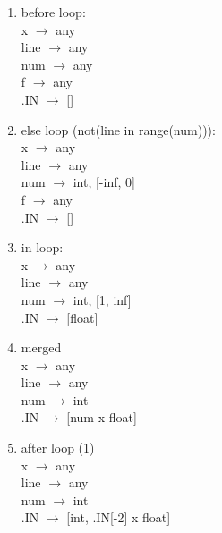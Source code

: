 \documentclass[11pt]{article}
\begin{document}
\begin{enumerate}
  \item before loop: \\
  x $\rightarrow$ any \\
  line $\rightarrow$ any \\
  num $\rightarrow$ any \\
  f $\rightarrow$ any \\
  .IN $\rightarrow$ []
  
  \item else loop (not(line in range(num))): \\
  x $\rightarrow$ any \\
  line $\rightarrow$ any \\
  num $\rightarrow$ int, [-inf, 0] \\
  f $\rightarrow$ any \\
  .IN $\rightarrow$ []
  
  \item in loop: \\
  x $\rightarrow$ any \\
  line $\rightarrow$ any \\
  num $\rightarrow$ int, [1, inf] \\
  .IN $\rightarrow$ [float]
  
  \item merged \\
  x $\rightarrow$ any \\
  line $\rightarrow$ any \\
  num $\rightarrow$ int \\
  .IN $\rightarrow$ [num x float]
  
  \item after loop (1) \\
  x $\rightarrow$ any \\
  line $\rightarrow$ any \\
  num $\rightarrow$ int \\
  .IN $\rightarrow$ [int, .IN[-2] x float]
\end{enumerate}
\end{document}
